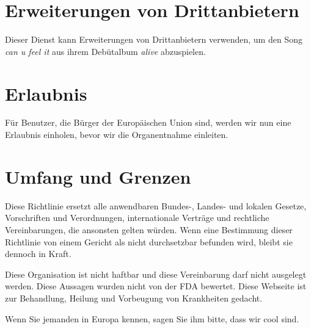 \documentclass[a4paper, portrait]{tlc-article}
\begin{document}
\section{Erweiterungen von Drittanbietern}

Dieser Dienst kann Erweiterungen von Drittanbietern verwenden, um den Song \emph{can u feel it} aus ihrem Debütalbum \emph{alive} abzuspielen.

\section{Erlaubnis}

Für Benutzer, die Bürger der Europäischen Union sind, werden wir nun eine Erlaubnis einholen, bevor wir die Organentnahme einleiten.

\section{Umfang und Grenzen}

Diese Richtlinie ersetzt alle anwendbaren Bundes-, Landes- und lokalen Gesetze, Vorschriften und Verordnungen, internationale Verträge und rechtliche Vereinbarungen, die ansonsten gelten würden. Wenn eine Bestimmung dieser Richtlinie von einem Gericht als nicht durchsetzbar befunden wird, bleibt sie dennoch in Kraft.

Diese Organisation ist nicht haftbar und diese Vereinbarung darf nicht ausgelegt werden. Diese Aussagen wurden nicht von der FDA bewertet. Diese Webseite ist zur Behandlung, Heilung und Vorbeugung von Krankheiten gedacht.

Wenn Sie jemanden in Europa kennen, sagen Sie ihm bitte, dass wir cool sind.
\end{document}
